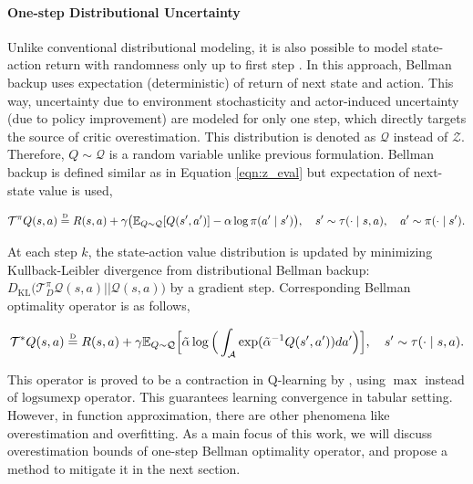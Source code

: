 \documentclass[10pt]{article} %
\newcommand\disteq{\mathrel{\stackrel{\makebox[0pt]{\mbox{\normalfont\tiny D}}}{=}}}
\begin{document}
\paragraph{One-step Distributional Uncertainty} Unlike conventional distributional modeling, it is also possible to model state-action return with randomness only up to first step \citet{achab2020ranking, achab2023one}. In this approach, Bellman backup uses expectation (deterministic) of return of next state and action. This way, uncertainty due to environment stochasticity and actor-induced uncertainty (due to policy improvement) are modeled for only one step, which directly targets the source of critic overestimation. This distribution is denoted as $\mathcal{Q}$ instead of $\mathcal{Z}$. Therefore, $Q\sim\mathcal{Q}$ is a random variable unlike previous formulation. Bellman backup is defined similar as in Equation \ref{eqn:z_eval} but expectation of next-state value is used, 

\begin{equation}
	\label{eqn:q_evs_eval}
	\mathcal{T}^{\pi} Q(s,a) \disteq R(s,a) + \gamma \big( \mathbb{E}_{Q\sim\mathcal{Q}}[Q(s',a')] - \alpha \log \pi(a' \mid s') \big), \quad s'\sim\tau(\cdot \mid s,a), \quad a' \sim \pi(\cdot \mid s'). 
\end{equation}

At each step $k$, the state-action value distribution is updated by minimizing Kullback-Leibler divergence from distributional Bellman backup: $D_{\mathrm{KL}} \big( \mathcal{T}^{\pi}_{D}\mathcal{Q}(s, a) || \mathcal{Q}(s, a) \big)$ by a gradient step. Corresponding Bellman optimality operator is as follows, 

\begin{equation}
	\label{eqn:q_optimal}
	\mathcal{T}^{*} Q(s,a) \disteq R(s,a) + \gamma \mathbb{E}_{Q\sim\mathcal{Q}} \Big[ \Tilde{\alpha} \log \Big( \int_{\mathcal{A}} \exp({\Tilde{\alpha}}^{-1} {Q}(s',a')) da' \Big) \Big], \quad s'\sim\tau(\cdot \mid s,a). 
\end{equation}

This operator is proved to be a contraction in Q-learning by \citet{achab2023one}, using $\max$ instead of $\text{logsumexp}$ operator. This guarantees learning convergence in tabular setting. However, in function approximation, there are other phenomena like overestimation and overfitting. As a main focus of this work, we will discuss overestimation bounds of one-step Bellman optimality operator, and propose a method to mitigate it in the next section. 
\end{document}
